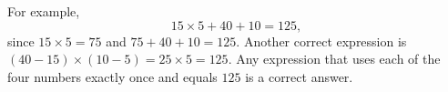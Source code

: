 For example,
\[
\boxed{15\times5+40+10=125},
\]
since $15\times5=75$ and $75+40+10=125$. Another correct expression is $(40-15)\times(10-5)=25\times5=125$. Any expression that uses each of the four numbers exactly once and equals $125$ is a correct answer.
